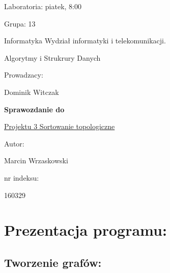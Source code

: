 \documentclass[12pt]{article}
\begin{document}
\begin{flushright}

Laboratoria: piatek, 8:00

Grupa: 13

Informatyka Wydział informatyki i telekomunikacji.

\end{flushright}

\hspace{4cm}

\begin{center}

Algorytmy i Strukrury Danych

Prowadzacy:

Dominik Witczak

\end{center}

\hspace{4cm}

\begin{center}

\textbf{Sprawozdanie do \LARGE}

\hspace{2cm}

\underline{Projektu 3 Sortowanie topologiczne}

\end{center}

\hspace{30cm}

\begin{flushright}

Autor:

Marcin Wrzaskowski

nr indeksu:

160329

\end{flushright}

\pagebreak

\section{Prezentacja programu: }

\subsection{Tworzenie grafów:}
\end{document}
